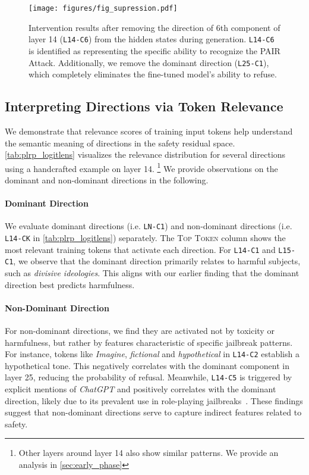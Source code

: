 \begin{figure}
    \vskip 0.2in
    \begin{center}
    \centerline{\texttt{[image: figures/fig\_supression.pdf]}}
    \caption{Intervention results after removing the direction of 6th component of layer 14 (\texttt{L14-C6}) from the hidden states during generation. \texttt{L14-C6} is identified as representing the specific ability to recognize the PAIR Attack. Additionally, we remove the dominant direction (\texttt{L25-C1}), which completely eliminates the fine-tuned model's ability to refuse.}
    \label{fig:intervention}
    \end{center}
    \vskip -0.2in
\end{figure}

\subsection{Interpreting Directions via Token Relevance}
\label{iterpret_tokens}

We demonstrate that relevance scores of training input tokens help understand the semantic meaning of directions in the safety residual space. \autoref{tab:plrp_logitlens} visualizes the relevance distribution for several directions using a handcrafted example on layer 14. \footnote{Other layers around layer 14 also show similar patterns. We provide an analysis in \autoref{sec:early_phase}} We provide observations on the dominant and non-dominant directions in the following.

\paragraph{Dominant Direction} We evaluate dominant directions (i.e. \texttt{LN-C1}) and non-dominant directions (i.e. \texttt{L14-CK} in \autoref{tab:plrp_logitlens}) separately. The \textsc{Top Token} column shows the most relevant training tokens that activate each direction. For \texttt{L14-C1} and \texttt{L15-C1}, we observe that the dominant direction primarily relates to harmful subjects, such as \textit{divisive ideologies}. This aligns with our earlier finding that the dominant direction best predicts harmfulness.

\paragraph{Non-Dominant Direction}
For non-dominant directions, we find they are activated not by toxicity or harmfulness, but rather by features characteristic of specific jailbreak patterns. For instance, tokens like \textit{Imagine}, \textit{fictional} and \textit{hypothetical} in \texttt{L14-C2} establish a hypothetical tone. This negatively correlates with the dominant component in layer 25, reducing the probability of refusal. Meanwhile, \texttt{L14-C5} is triggered by explicit mentions of \textit{ChatGPT} and positively correlates with the dominant direction, likely due to its prevalent use in role-playing jailbreaks~\cite{yu2023gptfuzzer}. These findings suggest that non-dominant directions serve to capture indirect features related to safety.

